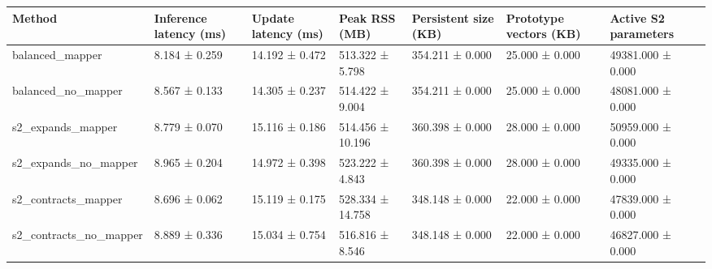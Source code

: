\begin{tabular}{lllllll}
\toprule
Method & Inference latency (ms) & Update latency (ms) & Peak RSS (MB) & Persistent size (KB) & Prototype vectors (KB) & Active S2 parameters \\
\midrule
balanced\_mapper & 8.184 ± 0.259 & 14.192 ± 0.472 & 513.322 ± 5.798 & 354.211 ± 0.000 & 25.000 ± 0.000 & 49381.000 ± 0.000 \\
balanced\_no\_mapper & 8.567 ± 0.133 & 14.305 ± 0.237 & 514.422 ± 9.004 & 354.211 ± 0.000 & 25.000 ± 0.000 & 48081.000 ± 0.000 \\
s2\_expands\_mapper & 8.779 ± 0.070 & 15.116 ± 0.186 & 514.456 ± 10.196 & 360.398 ± 0.000 & 28.000 ± 0.000 & 50959.000 ± 0.000 \\
s2\_expands\_no\_mapper & 8.965 ± 0.204 & 14.972 ± 0.398 & 523.222 ± 4.843 & 360.398 ± 0.000 & 28.000 ± 0.000 & 49335.000 ± 0.000 \\
s2\_contracts\_mapper & 8.696 ± 0.062 & 15.119 ± 0.175 & 528.334 ± 14.758 & 348.148 ± 0.000 & 22.000 ± 0.000 & 47839.000 ± 0.000 \\
s2\_contracts\_no\_mapper & 8.889 ± 0.336 & 15.034 ± 0.754 & 516.816 ± 8.546 & 348.148 ± 0.000 & 22.000 ± 0.000 & 46827.000 ± 0.000 \\
\bottomrule
\end{tabular}
